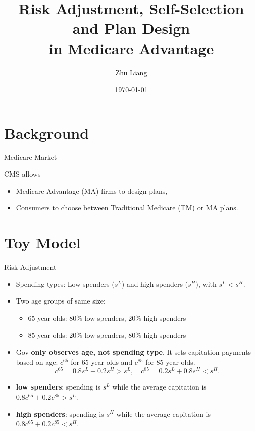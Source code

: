 \documentclass[professionalfonts, aspectratio=169]{beamer}
\title{Risk Adjustment, Self-Selection and Plan Design \\ in Medicare Advantage}
\institute{Stony Brook University}
\author{Zhu Liang}
\date{\today}
\begin{document}

\begin{frame} %
    \titlepage
\end{frame}

\section{Background}
\begin{frame}{Medicare Market}
\begin{figure}
  \centering
  \resizebox{0.6\textwidth}{!}{}
\end{figure}

CMS allows
\begin{itemize}\small
  \item Medicare Advantage (MA) firms to design plans,
  \item Consumers to choose between Traditional Medicare (TM) or MA plans.
\end{itemize}
\end{frame}

\section{Toy Model}


\begin{frame}{Risk Adjustment}
  \begin{itemize}
      \item Spending types: Low spenders ($s^L$) and high spenders ($s^H$), with $s^L < s^H$.
      \item Two age groups of same size:
      \begin{itemize}
          \item 65-year-olds: 80\% low spenders, 20\% high spenders
          \item 85-year-olds: 20\% low spenders, 80\% high spenders
      \end{itemize}
      \item Gov \textbf{only observes age, not spending type}. It sets capitation payments based on age: $c^{65}$ for 65-year-olds and $c^{85}$ for 85-year-olds.
      $$ c^{65} = 0.8s^L + 0.2s^H > s^L, \quad c^{85} = 0.2s^L + 0.8s^H < s^H. $$
      \item \textbf{low spenders}: spending is $ s^L $ while the average capitation is $ 0.8 c^{65} + 0.2 c^{85} > s^L $.
      \item \textbf{high spenders}: spending is $ s^H $ while the average capitation is $ 0.8 c^{65} + 0.2 c^{85} < s^H $.
  \end{itemize}
\end{frame}
\end{document}
